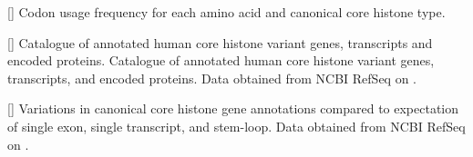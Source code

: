   \newpage
  \newpage
  []{%
    Codon usage frequency for each amino acid
    and canonical core histone type.
  }
  \label{tab:histone-gene-codonusage}
  

  \newpage
  []{%
    Catalogue of annotated human core histone variant genes, transcripts and encoded proteins.
    Catalogue of annotated human core histone variant genes, transcripts,
    and encoded proteins.
    Data obtained from NCBI RefSeq \citep{OLearyRefseq2016} on
    \SequencesDate{}.
  }

  \label{tab:variant-catalogue}
  

  \newpage
  \begin{center}
    []{
        Variations in canonical core histone gene annotations
        compared to expectation of single exon, single transcript, and stem-loop.
        Data obtained from NCBI RefSeq \citep{OLearyRefseq2016} on
        \SequencesDate{}.
    }
    \label{tab:curation-anomalies}
    \begin{itemize}
    
    \end{itemize}
  \end{center}
